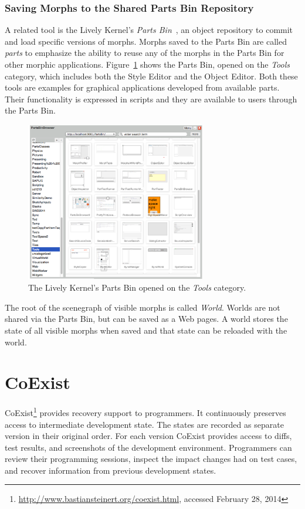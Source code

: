 \subsubsection{Saving Morphs to the Shared Parts Bin Repository}

A related tool is the Lively Kernel's \emph{Parts Bin}~\cite{Lincke2012LPC}, an object repository to commit and load specific versions of morphs.
Morphs saved to the Parts Bin are called \emph{parts} to emphasize the ability to reuse any of the morphs in the Parts Bin for other morphic applications.
Figure~\ref{fig:PartsBin} shows the Parts Bin, opened on the \emph{Tools} category, which includes both the Style Editor and the Object Editor.
Both these tools are examples for graphical applications developed from available parts.
Their functionality is expressed in scripts and they are available to users through the Parts Bin.

\begin{figure}[h]
    \centering
    \includegraphics[width=0.7\textwidth]{figures/2_background/3_partsBin.pdf}
    \caption{The Lively Kernel's Parts Bin opened on the \emph{Tools} category.}
    \label{fig:PartsBin}
\end{figure}

The root of the scenegraph of visible morphs is called \emph{World}.
Worlds are not shared via the Parts Bin, but can be saved as a Web pages.
A world stores the state of all visible morphs when saved and that state can be reloaded with the world.


\section{CoExist}

CoExist\footnote{\url{http://www.bastiansteinert.org/coexist.html}, accessed February 28, 2014} provides recovery support to programmers.
It continuously preserves access to intermediate development state.
The states are recorded as separate version in their original order. 
For each version CoExist provides access to diffs, test results, and screenshots of the development environment.
Programmers can review their programming sessions, inspect the impact changes had on test cases, and recover information from previous development states.


